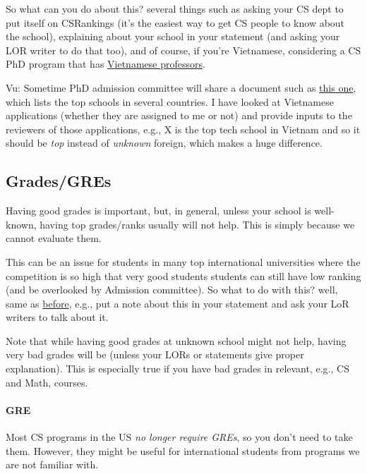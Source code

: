 \documentclass[11pt]{article}
\newenvironment{commentbox}{
 \small
    \begin{cbox}
 }{
   \end{cbox}
}
\newcommand{\red}[1]{{\color{red}{#1}}}
\begin{document}
So what can you do about this? several things such as asking your CS dept to put itself on CSRankings (it's the easiest way to get CS people to know about the school), explaining about your school in your statement (and asking your LOR writer to do that too), and of course, if you're Vietnamese, considering a CS PhD program that has \href{https://github.com/dynaroars/dynaroars.github.io/wiki/Viet-CS-Profs-US}{Vietnamese professors}.

\begin{commentbox}
Vu: Sometime PhD admission committee will share a document such as \href{https://github.com/dynaroars/dynaroars.github.io/wiki/Foreign-Top-Schools}{this one}, which lists the top schools in several countries. I have looked at Vietnamese applications (whether they are assigned to me or not) and provide inputs to the reviewers of those applications, e.g., X is the top tech school in Vietnam and so it should be \emph{top} instead of \emph{unknown} foreign, which makes a huge difference.
\end{commentbox}

\subsection{Grades/GREs}\label{sec:grades}
Having good grades is important, but, in general, unless your school is well-known, having top grades/ranks
usually will not help. This is simply because we cannot evaluate them.

This can be an issue for students in many top international universities where the competition is so high that very good students students can still have low ranking (and be overlooked by Admission committee).
So what to do with this? well, same as \hyperref[sec:your-school]{before}, e.g., put a note about this in your statement and ask your LoR writers to talk about it.

Note that while having good grades at unknown school might not help,
having very bad grades will be \red{red flag} (unless your LORs or
statements give proper explanation). This is especially true if you
have bad grades in relevant, e.g., CS and Math, courses.

\paragraph{GRE} Most CS programs in the US \emph{no longer require GREs}, so you don't need to
take them. However, they might be useful for international students from programs we are not familiar with. 
\end{document}
